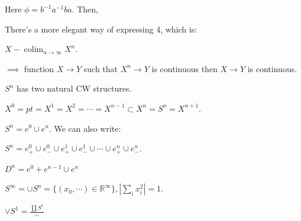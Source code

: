 \documentclass{article}
\theoremstyle{definition}
\begin{document}
    Here \(\phi = b ^{-1} a ^{-1} b a\). Then,
    
    \begin{center}
    \end{center}

    There's a more elegant way of expressing 4, which is:

    \(X - \operatorname{colim}_{n\to \infty} X^n\).
    
    \begin{center}
    \end{center}

    \(\implies\) function \(X \to Y\) such that \(X^n \to Y\) is continuous then \(X \to Y\) is continuous.

    \(S^n\) has two natural CW structures.

    \(X^0 = pt = X^1 = X^2 = \cdots = X^{n-1} \subset X^n = S^n = X^{n+1}\).

    \(S^n = e^0 \cup e^n\). We can also write:

    \(S^n = e^0_+ \cup e^0_- \cup e^1_+ \cup e^1_- \cup \cdots \cup e^n_+ \cup e^n_-\).

    \(D^n = e^0 + e^{n-1} \cup e^n\)

    \begin{center}
    \end{center}

    \(S^{\infty} = \cup S^n = \{ (x_0, \cdots) \in \mathbb{R}^{\infty} \}, \left\vert \sum_{i} x_i^2 \right\vert = 1\).
    
    \(\vee S^1 = \frac{\coprod S^1}{\sim}\) 
\end{document}
